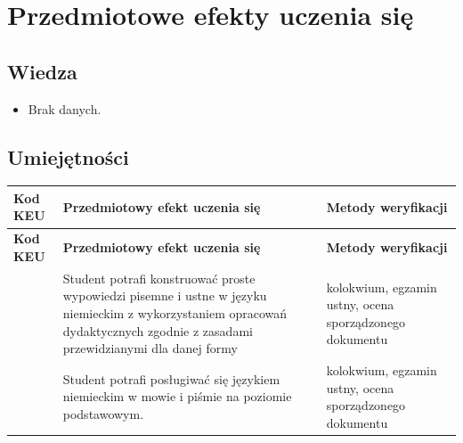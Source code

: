 \documentclass[12pt, a4paper]{article}
\newcommand{\thdrule}{\noalign{\global\setlength{\extrarowheight}{0pt}}}
\newcommand{\thdend}{\noalign{\global\setlength{\extrarowheight}{3pt}}}
\begin{document}
\section{Przedmiotowe efekty uczenia się}

\subsection*{Wiedza}
\begin{itemize}
  \item Brak danych.
\end{itemize}

\subsection*{Umiejętności}
{\scriptsize
\begin{longtable}{m{1.6cm}m{9.0cm}m{4.2cm}}
\thdrule\toprule
\rowcolor{pjatkRed} {\color{white}\footnotesize\textbf{\vphantom{Ag}Kod KEU}} & {\color{white}\footnotesize\textbf{\vphantom{Ag}Przedmiotowy efekt uczenia się}} & {\color{white}\footnotesize\textbf{\vphantom{Ag}Metody weryfikacji}} \\
\midrule\thdend
\endfirsthead
\thdrule\toprule
\rowcolor{pjatkRed} {\color{white}\footnotesize\textbf{\vphantom{Ag}Kod KEU}} & {\color{white}\footnotesize\textbf{\vphantom{Ag}Przedmiotowy efekt uczenia się}} & {\color{white}\footnotesize\textbf{\vphantom{Ag}Metody weryfikacji}} \\
\midrule\thdend
\endhead
  \rowcolor{tableRowLight}  & Student potrafi konstruować proste wypowiedzi pisemne i ustne w języku niemieckim z wykorzystaniem opracowań dydaktycznych zgodnie z zasadami przewidzianymi dla danej formy & kolokwium, egzamin ustny, ocena sporządzonego dokumentu \\
  \rowcolor{tableRowAlt}  & Student potrafi posługiwać się językiem niemieckim w mowie i piśmie na poziomie podstawowym. & kolokwium, egzamin ustny, ocena sporządzonego dokumentu \\
\bottomrule
\end{longtable}}
\end{document}
